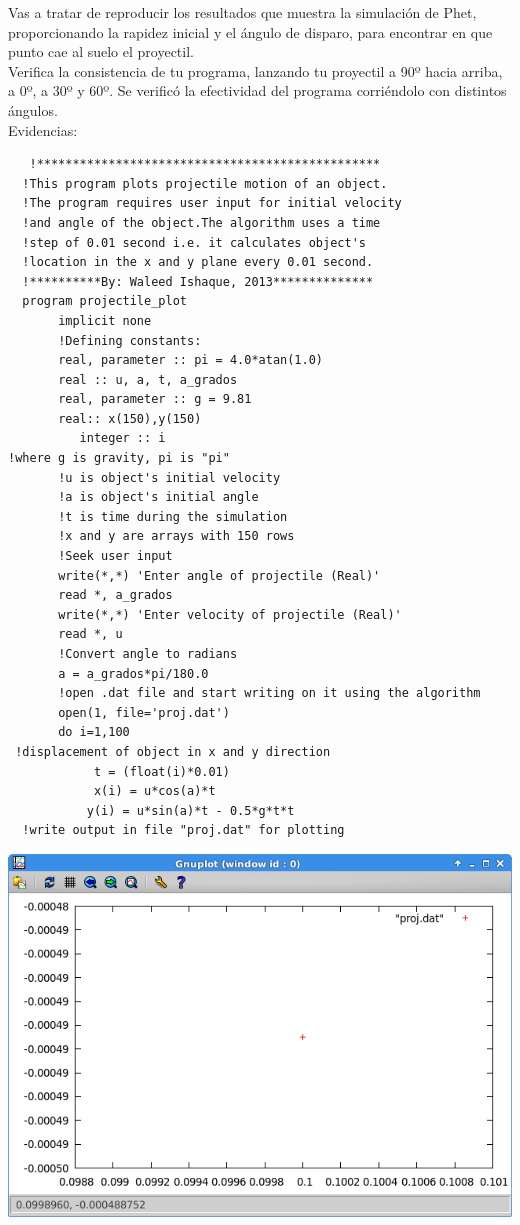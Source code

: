 \documentclass[12pt]{article}
\begin{document}
Vas a tratar de reproducir los resultados que muestra la simulación de Phet, proporcionando la rapidez inicial y el ángulo de disparo, para encontrar en que punto cae al suelo el proyectil.\\
 Verifica la consistencia de tu programa, lanzando tu proyectil a 90º hacia arriba, a 0º, a 30º y 60º.
 Se verificó la efectividad del programa corriéndolo con distintos ángulos.\\
 Evidencias:\\
 \begin{verbatim}
   !************************************************  
  !This program plots projectile motion of an object.  
  !The program requires user input for initial velocity   
  !and angle of the object.The algorithm uses a time   
  !step of 0.01 second i.e. it calculates object's  
  !location in the x and y plane every 0.01 second.  
  !**********By: Waleed Ishaque, 2013**************  
  program projectile_plot  
       implicit none  
       !Defining constants:  
       real, parameter :: pi = 4.0*atan(1.0)
       real :: u, a, t, a_grados  
       real, parameter :: g = 9.81  
       real:: x(150),y(150)  
          integer :: i
!where g is gravity, pi is "pi"   
       !u is object's initial velocity   
       !a is object's initial angle   
       !t is time during the simulation   
       !x and y are arrays with 150 rows   
       !Seek user input   
       write(*,*) 'Enter angle of projectile (Real)'   
       read *, a_grados   
       write(*,*) 'Enter velocity of projectile (Real)'   
       read *, u   
       !Convert angle to radians   
       a = a_grados*pi/180.0   
       !open .dat file and start writing on it using the algorithm   
       open(1, file='proj.dat')   
       do i=1,100   
 !displacement of object in x and y direction   
            t = (float(i)*0.01)   
            x(i) = u*cos(a)*t   
           y(i) = u*sin(a)*t - 0.5*g*t*t   
  !write output in file "proj.dat" for plotting   
            \end{verbatim}
            \centering
\includegraphics[scale=0.5]{0.png}
\end{document}
